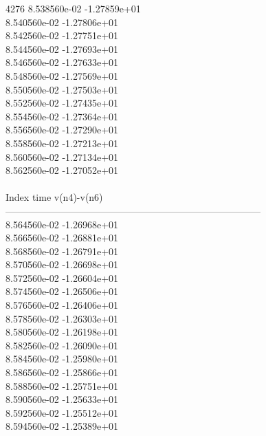 4276	8.538560e-02	-1.27859e+01	\\ 	8.540560e-02	-1.27806e+01	\\ 	8.542560e-02	-1.27751e+01	\\ 	8.544560e-02	-1.27693e+01	\\ 	8.546560e-02	-1.27633e+01	\\ 	8.548560e-02	-1.27569e+01	\\ 	8.550560e-02	-1.27503e+01	\\ 	8.552560e-02	-1.27435e+01	\\ 	8.554560e-02	-1.27364e+01	\\ 	8.556560e-02	-1.27290e+01	\\ 	8.558560e-02	-1.27213e+01	\\ 	8.560560e-02	-1.27134e+01	\\ 	8.562560e-02	-1.27052e+01	\\ \hline
\\ \hline
Index   time            v(n4)-v(n6)     \\ \hline
--------------------------------------------------------------------------------\\ 	8.564560e-02	-1.26968e+01	\\ 	8.566560e-02	-1.26881e+01	\\ 	8.568560e-02	-1.26791e+01	\\ 	8.570560e-02	-1.26698e+01	\\ 	8.572560e-02	-1.26604e+01	\\ 	8.574560e-02	-1.26506e+01	\\ 	8.576560e-02	-1.26406e+01	\\ 	8.578560e-02	-1.26303e+01	\\ 	8.580560e-02	-1.26198e+01	\\ 	8.582560e-02	-1.26090e+01	\\ 	8.584560e-02	-1.25980e+01	\\ 	8.586560e-02	-1.25866e+01	\\ 	8.588560e-02	-1.25751e+01	\\ 	8.590560e-02	-1.25633e+01	\\ 	8.592560e-02	-1.25512e+01	\\ 	8.594560e-02	-1.25389e+01	\\ \hline
